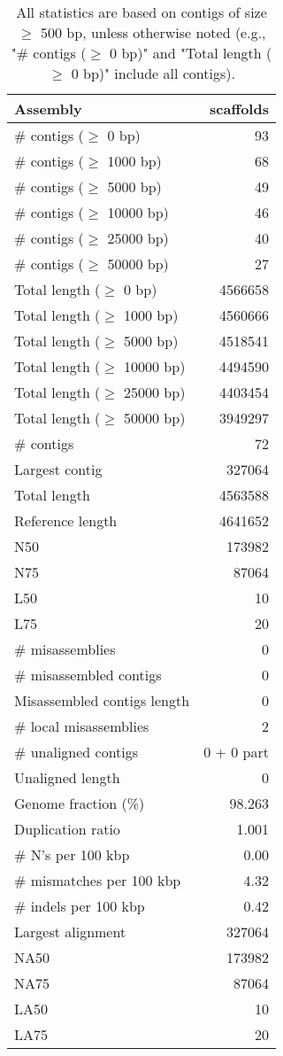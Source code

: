 \documentclass[12pt,a4paper]{article}
\begin{document}
\begin{table}[ht]
\begin{center}
\caption{All statistics are based on contigs of size $\geq$ 500 bp, unless otherwise noted (e.g., "\# contigs ($\geq$ 0 bp)" and "Total length ($\geq$ 0 bp)" include all contigs).}
\begin{tabular}{|l*{1}{|r}|}
\hline
Assembly & scaffolds \\ \hline
\# contigs ($\geq$ 0 bp) & 93 \\ \hline
\# contigs ($\geq$ 1000 bp) & 68 \\ \hline
\# contigs ($\geq$ 5000 bp) & 49 \\ \hline
\# contigs ($\geq$ 10000 bp) & 46 \\ \hline
\# contigs ($\geq$ 25000 bp) & 40 \\ \hline
\# contigs ($\geq$ 50000 bp) & 27 \\ \hline
Total length ($\geq$ 0 bp) & 4566658 \\ \hline
Total length ($\geq$ 1000 bp) & 4560666 \\ \hline
Total length ($\geq$ 5000 bp) & 4518541 \\ \hline
Total length ($\geq$ 10000 bp) & 4494590 \\ \hline
Total length ($\geq$ 25000 bp) & 4403454 \\ \hline
Total length ($\geq$ 50000 bp) & 3949297 \\ \hline
\# contigs & 72 \\ \hline
Largest contig & 327064 \\ \hline
Total length & 4563588 \\ \hline
Reference length & 4641652 \\ \hline
N50 & 173982 \\ \hline
N75 & 87064 \\ \hline
L50 & 10 \\ \hline
L75 & 20 \\ \hline
\# misassemblies & 0 \\ \hline
\# misassembled contigs & 0 \\ \hline
Misassembled contigs length & 0 \\ \hline
\# local misassemblies & 2 \\ \hline
\# unaligned contigs & 0 + 0 part \\ \hline
Unaligned length & 0 \\ \hline
Genome fraction (\%) & 98.263 \\ \hline
Duplication ratio & 1.001 \\ \hline
\# N's per 100 kbp & 0.00 \\ \hline
\# mismatches per 100 kbp & 4.32 \\ \hline
\# indels per 100 kbp & 0.42 \\ \hline
Largest alignment & 327064 \\ \hline
NA50 & 173982 \\ \hline
NA75 & 87064 \\ \hline
LA50 & 10 \\ \hline
LA75 & 20 \\ \hline
\end{tabular}
\end{center}
\end{table}
\end{document}
